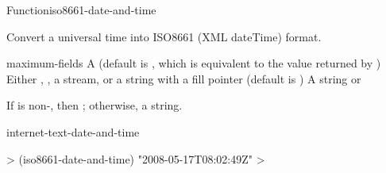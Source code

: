 \documentclass[10pt,twoside,english,pdftex]{article}
\begin{document}
\begin{functiondoc}{Function}{iso8661-date-and-time}{%
      
    \returns{} }
% 

\fnsyntax

\fnpurpose Convert a universal time into ISO8661 (XML dateTime) format.

\fnpackage {}

\fnmodule {}

\fnargs
\begin{args}{maximum-fields}
 A  (default is \nil,
  which is equivalent to the value returned by
  )
\arg[destination] Either \nil, , a stream, or a string with a fill 
pointer (default is \nil)
\arg[result] A string or \nil{}
\end{args}

\fnreturns If  is non-\nil, then \nil; otherwise, a string.

\begin{alsos}{internet-text-date-and-time}
\end{alsos}

\fnexample
%
\W\supp
\begin{example}
  > (iso8661-date-and-time)
  "2008-05-17T08:02:49Z"
  >
\end{example}

\end{functiondoc}

\end{document}
